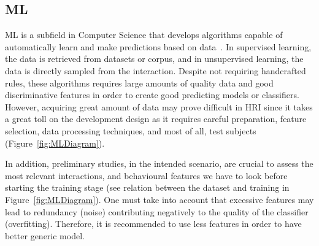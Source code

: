 \subsection{\acl{ML}}
\label{subsec:MachineLearning}

\acf{ML} is a subfield in Computer Science that develops algorithms capable of automatically learn and make predictions based on data~\cite{Bishop2006}. In supervised learning, the data is retrieved from datasets or corpus, and in unsupervised learning, the data is directly sampled from the interaction. Despite not requiring handcrafted rules, these algorithms requires large amounts of quality data and good discriminative features in order to create good predicting models or classifiers. However, acquiring great amount of data may prove difficult in \ac{HRI} since it takes a great toll on the development design as it requires careful preparation, feature selection, data processing techniques, and most of all, test subjects (Figure~\ref{fig:MLDiagram}).

In addition, preliminary studies, in the intended scenario, are crucial to assess the most relevant interactions, and behavioural features we have to look before starting the training stage (see relation between the dataset and training in Figure~\ref{fig:MLDiagram}). One must take into account that excessive features may lead to redundancy (noise) contributing negatively to the quality of the classifier (overfitting). Therefore, it is recommended to use less features in order to have better generic model.



